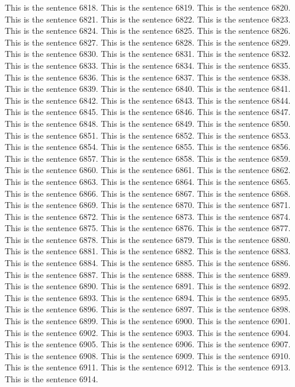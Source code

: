 \documentclass{article}
\begin{document}
This is the sentence 6818.
This is the sentence 6819.
This is the sentence 6820.
This is the sentence 6821.
This is the sentence 6822.
This is the sentence 6823.
This is the sentence 6824.
This is the sentence 6825.
This is the sentence 6826.
This is the sentence 6827.
This is the sentence 6828.
This is the sentence 6829.
This is the sentence 6830.
This is the sentence 6831.
This is the sentence 6832.
This is the sentence 6833.
This is the sentence 6834.
This is the sentence 6835.
This is the sentence 6836.
This is the sentence 6837.
This is the sentence 6838.
This is the sentence 6839.
This is the sentence 6840.
This is the sentence 6841.
This is the sentence 6842.
This is the sentence 6843.
This is the sentence 6844.
This is the sentence 6845.
This is the sentence 6846.
This is the sentence 6847.
This is the sentence 6848.
This is the sentence 6849.
This is the sentence 6850.
This is the sentence 6851.
This is the sentence 6852.
This is the sentence 6853.
This is the sentence 6854.
This is the sentence 6855.
This is the sentence 6856.
This is the sentence 6857.
This is the sentence 6858.
This is the sentence 6859.
This is the sentence 6860.
This is the sentence 6861.
This is the sentence 6862.
This is the sentence 6863.
This is the sentence 6864.
This is the sentence 6865.
This is the sentence 6866.
This is the sentence 6867.
This is the sentence 6868.
This is the sentence 6869.
This is the sentence 6870.
This is the sentence 6871.
This is the sentence 6872.
This is the sentence 6873.
This is the sentence 6874.
This is the sentence 6875.
This is the sentence 6876.
This is the sentence 6877.
This is the sentence 6878.
This is the sentence 6879.
This is the sentence 6880.
This is the sentence 6881.
This is the sentence 6882.
This is the sentence 6883.
This is the sentence 6884.
This is the sentence 6885.
This is the sentence 6886.
This is the sentence 6887.
This is the sentence 6888.
This is the sentence 6889.
This is the sentence 6890.
This is the sentence 6891.
This is the sentence 6892.
This is the sentence 6893.
This is the sentence 6894.
This is the sentence 6895.
This is the sentence 6896.
This is the sentence 6897.
This is the sentence 6898.
This is the sentence 6899.
This is the sentence 6900.
This is the sentence 6901.
This is the sentence 6902.
This is the sentence 6903.
This is the sentence 6904.
This is the sentence 6905.
This is the sentence 6906.
This is the sentence 6907.
This is the sentence 6908.
This is the sentence 6909.
This is the sentence 6910.
This is the sentence 6911.
This is the sentence 6912.
This is the sentence 6913.
This is the sentence 6914.
\end{document}
